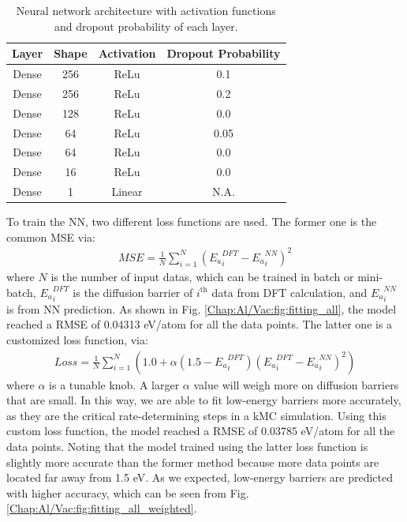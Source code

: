 \begin{table}[!htbp]
\centering
\caption[Neural network architecture with activation functions and dropout probability of each layer.]{Neural network architecture with activation functions and dropout probability of each layer.}
\label{Chap:Al/Vac:tab:NN}
\begin{tabular}{cccc}
\\
\hline
\hline
Layer & Shape  & Activation  & Dropout Probability\\ 
\hline
Dense & 256    & ReLu       & 0.1                 \\
Dense & 256    & ReLu       & 0.2                 \\
Dense & 128    & ReLu       & 0.0                 \\
Dense & 64     & ReLu       & 0.05                \\
Dense & 64     & ReLu       & 0.0                 \\
Dense & 16     & ReLu       & 0.0                 \\
Dense & 1      & Linear     & N.A.                \\ 
\hline
\hline
\end{tabular}
\end{table}


To train the \ac{NN}, two different loss functions are used. The former one is the common \acf{MSE} via:
\begin{subequations}
\begin{align}
MSE = \frac{1}{N}\sum_{i=1}^{N}({E_a}_{i}^{DFT} - {E_a}_{i}^{NN})^2
\label{Chap:Al/Vac:eq:MSE}
\end{align}
\end{subequations}
where $N$ is the number of input datas, which can be trained in batch or mini-batch, ${E_a}_i^{DFT}$ is the diffusion barrier of $i^{\text{th}}$ data from \ac{DFT} calculation, and ${E_a}_{i}^{NN}$ is from \ac{NN} prediction. As shown in Fig. \ref{Chap:Al/Vac:fig:fitting_all}, the model reached a \ac{RMSE} of 0.04313 eV/atom for all the data points. The latter one is a customized loss function, via:
\begin{subequations}
\begin{align}
Loss = \frac{1}{N}\sum_{i=1}^{N}{(1.0 + \alpha (1.5 - {E_a}_{i}^{DFT})({E_a}_{i}^{DFT} - {E_a}_{i}^{NN})^2)}
\label{Chap:Al/Vac:eq:custLoss}
\end{align}
\end{subequations}
where $\alpha$ is a tunable knob. A larger $\alpha$ value will weigh more on diffusion barriers that are small. In this way, we are able to fit low-energy barriers more accurately, as they are the critical rate-determining steps in a \ac{kMC} simulation. Using this custom loss function, the model reached a \ac{RMSE} of 0.03785 eV/atom for all the data points. Noting that the model trained using the latter loss function is slightly more accurate than the former method because more data points are located far away from 1.5 eV. As we expected, low-energy barriers are predicted with higher accuracy, which can be seen from Fig. \ref{Chap:Al/Vac:fig:fitting_all_weighted}.


